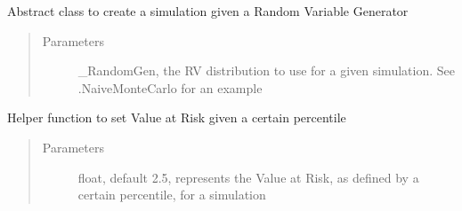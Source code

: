 \documentclass[letterpaper,10pt,english]{sphinxmanual}
\begin{document}
\begin{fulllineitems}
\label{\detokenize{simulation:risk_dash.simgen._Simulation}}
\sphinxAtStartPar
Abstract class to create a simulation given a Random Variable Generator
\begin{quote}\begin{description}
\item[{Parameters}] \leavevmode
\sphinxAtStartPar
{} \textendash{} \_RandomGen, the RV distribution to use for a given simulation. See .NaiveMonteCarlo for an example

\end{description}\end{quote}

\begin{fulllineitems}
\label{\detokenize{simulation:risk_dash.simgen._Simulation.set_var}}
\sphinxAtStartPar
Helper function to set Value at Risk given a certain percentile
\begin{quote}\begin{description}
\item[{Parameters}] \leavevmode
\sphinxAtStartPar
{} \textendash{} float, default 2.5, represents the Value at Risk, as defined by a certain percentile, for a simulation

\end{description}\end{quote}

\end{fulllineitems}


\end{fulllineitems}

\end{document}

